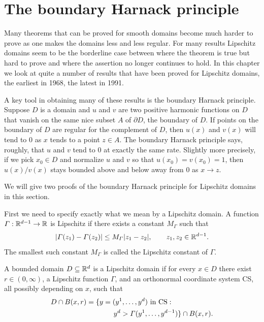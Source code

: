 \label{ch3}

\section{The boundary Harnack principle}\label{ch3_sec1}



Many theorems that can be proved for smooth domains become much harder to prove as one makes the domains less and less regular. For many results Lipschitz domains seem to be the borderline case between where the theorem is true but hard to prove and where the assertion no longer continues to hold. In this chapter we look at quite a number of results that have been proved for Lipschitz domains, the earliest in 1968, the latest in 1991.

A key tool in obtaining many of these results is the boundary Harnack principle. Suppose $D$ is a domain and $u$ and $v$ are two positive harmonic functions on $D$ that vanish on the same nice subset $A$ of $\partial D$, the boundary of $D$. If points on the boundary of $D$ are regular for the complement of $D$, then $u(x)$ and $v(x)$ will tend to $0$ as $x$ tends to a point $z \in A$. The boundary Harnack principle says, roughly, that $u$ and $v$ tend to $0$ at exactly the same rate. Slightly more precisely, if we pick $x_0 \in D$ and normalize $u$ and $v$ so that $u(x_0) = v(x_0) = 1$, then $u(x)/v(x)$ stays bounded above and below away from $0$ as $x \to z$.

We will give two proofs of the boundary Harnack principle for Lipschitz domains in this section.

First we need to specify exactly what we mean by a Lipschitz domain. A function $\Gamma : \R^{d-1} \to \R$ is Lipschitz if there exists a constant $M_\Gamma$ such that
\mpagebreak
\begin{equation}\label{eq:ch3_1.1}
    |\Gamma(z_1) - \Gamma(z_2)| \leq M_\Gamma|z_1 - z_2|, \qquad z_1, z_2 \in \R^{d-1}.
\end{equation}
The smallest such constant $M_\Gamma$ is called the Lipschitz constant of $\Gamma$.

\begin{definition}\label{def:ch3_1.1}
A bounded domain $D \subseteq \R^d$ is a Lipschitz domain if for every $x \in D$ there exist $r \in (0,\infty)$, a Lipschitz function $\Gamma$, and an orthonormal coordinate system CS, all possibly depending on $x$, such that
\begin{align}\label{eq:ch3_1.2}
    D \cap B(x,r) &= \{y=(y^1,\ldots,y^d)~\text{in CS} : \\
    &\qquad\qquad\! y^d > \Gamma(y^1,\ldots,y^{d-1})\} \cap B(x,r). \notag
\end{align}
\end{definition}

